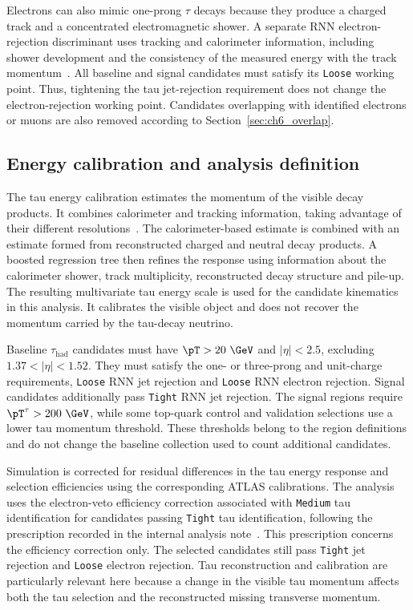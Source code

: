 Electrons can also mimic one-prong $\tau$ decays because they produce a charged track and a concentrated electromagnetic shower.
A separate RNN electron-rejection discriminant uses tracking and calorimeter information, including shower development and the consistency of the measured energy with the track momentum~\cite{ATLAS2022TauR22}.
All baseline and signal candidates must satisfy its \texttt{Loose} working point.
Thus, tightening the tau jet-rejection requirement does not change the electron-rejection working point.
Candidates overlapping with identified electrons or muons are also removed according to Section~\ref{sec:ch6_overlap}.

\subsection{Energy calibration and analysis definition}

The tau energy calibration estimates the momentum of the visible decay products.
It combines calorimeter and tracking information, taking advantage of their different resolutions~\cite{ATLAS2022TauR22}.
The calorimeter-based estimate is combined with an estimate formed from reconstructed charged and neutral decay products.
A boosted regression tree then refines the response using information about the calorimeter shower, track multiplicity, reconstructed decay structure and pile-up.
The resulting multivariate tau energy scale is used for the candidate kinematics in this analysis.
It calibrates the visible object and does not recover the momentum carried by the tau-decay neutrino.

Baseline $\tau_{\mathrm{had}}$ candidates must have $\pT>20~\GeV$ and $|\eta|<2.5$, excluding $1.37<|\eta|<1.52$.
They must satisfy the one- or three-prong and unit-charge requirements, \texttt{Loose} RNN jet rejection and \texttt{Loose} RNN electron rejection.
Signal candidates additionally pass \texttt{Tight} RNN jet rejection.
The signal regions require $\pT^{\tau}>200~\GeV$, while some top-quark control and validation selections use a lower tau momentum threshold.
These thresholds belong to the region definitions and do not change the baseline collection used to count additional candidates.

Simulation is corrected for residual differences in the tau energy response and selection efficiencies using the corresponding ATLAS calibrations.
The analysis uses the electron-veto efficiency correction associated with \texttt{Medium} tau identification for candidates passing \texttt{Tight} tau identification, following the prescription recorded in the internal analysis note~\cite{LQInternalNote2026}.
This prescription concerns the efficiency correction only.
The selected candidates still pass \texttt{Tight} jet rejection and \texttt{Loose} electron rejection.
Tau reconstruction and calibration are particularly relevant here because a change in the visible tau momentum affects both the tau selection and the reconstructed missing transverse momentum.

